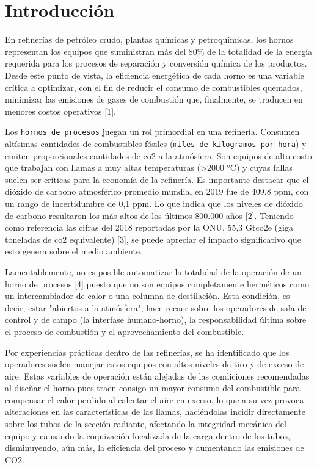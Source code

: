 \chapter*{Introducción}

\par En refinerías de petróleo crudo, plantas químicas y petroquímicas, los hornos representan los equipos que suministran más del 80\% de la totalidad de la energía requerida para los procesos de separación y conversión química de los productos. Desde este punto de vista, la eficiencia energética de cada horno es una variable crítica a optimizar, con el fin de reducir el consumo de combustibles quemados, minimizar las emisiones de gases de combustión que, finalmente, se traducen en menores costos operativos [1].

\par Los \texttt{hornos de procesos} juegan un rol primordial en una refinería. Consumen altísimas cantidades de combustibles fósiles ({\tt miles de kilogramos por hora}) y emiten proporcionales cantidades de \ac{co2} a la atmósfera. Son equipos de alto costo que trabajan con llamas a muy altas temperaturas (\textgreater 2000 °C) y cuyas fallas suelen ser críticas para la economía de la refinería. Es importante destacar que el dióxido de carbono atmosférico promedio mundial en 2019 fue de 409,8 ppm, con un rango de incertidumbre de 0,1 ppm. Lo que indica que los niveles de dióxido de carbono resultaron los más altos de los últimos 800.000 años [2]. Teniendo como referencia las cifras del 2018 reportadas por la \ac{ONU}, 55,3 Gt\ac{co2}e (giga toneladas de \ac{co2} equivalente) [3], se puede apreciar el impacto significativo que esto genera sobre el medio ambiente. 

\par Lamentablemente, no es posible automatizar la totalidad de la operación de un horno de procesos [4] puesto que no son equipos completamente herméticos como un intercambiador de calor o una columna de destilación. Esta condición, es decir, estar "abiertos a la atmósfera", hace recaer sobre los operadores de sala de control y de campo (la interfase humano-horno), la responsabilidad última sobre el proceso de combustión y el aprovechamiento del combustible.  

\par Por experiencias prácticas dentro de las refinerías, se ha identificado que los operadores suelen manejar estos equipos con altos niveles de tiro y de exceso de aire. Estas variables de operación están alejadas de las condiciones recomendadas al diseñar el horno pues traen consigo un mayor consumo del combustible para compensar el calor perdido al calentar el aire en exceso, lo que a su vez provoca alteraciones en las características de las llamas, haciéndolas incidir directamente sobre los tubos de la sección radiante, afectando la integridad mecánica del equipo y causando la coquización localizada de la carga dentro de los tubos, disminuyendo, aún más, la eficiencia del proceso y aumentando las emisiones de CO2.

